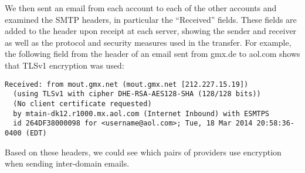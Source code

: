 We then sent an email from each account to each of the other accounts and 
examined the SMTP headers, in particular the “Received” fields.  These fields 
are added to the header upon receipt at each server, showing the sender and 
receiver as well as the protocol and security measures used in the transfer.  
For example, the following field from the header of an email sent from gmx.de to 
aol.com shows that TLSv1 encryption was used:

\begin{lstlisting}
Received: from mout.gmx.net (mout.gmx.net [212.227.15.19])
  (using TLSv1 with cipher DHE-RSA-AES128-SHA (128/128 bits))
  (No client certificate requested)
  by mtain-dk12.r1000.mx.aol.com (Internet Inbound) with ESMTPS
  id 264DF38000098 for <username@aol.com>; Tue, 18 Mar 2014 20:58:36-0400 (EDT)
\end{lstlisting}

Based on these headers, we could see which pairs of providers use encryption 
when sending inter-domain emails.

